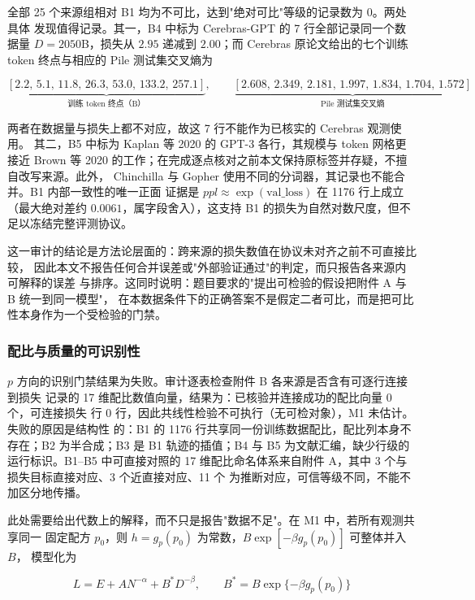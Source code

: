 \documentclass[bwprint]{gmcmthesis}
\numberwithin{equation}{section}
\numberwithin{figure}{section}
\numberwithin{table}{section}
\begin{document}
全部 25 个来源组相对 B1 均为不可比，达到"绝对可比"等级的记录数为 0。两处具体
发现值得记录。其一，B4 中标为 Cerebras-GPT 的 7 行全部记录同一个数据量
$D=2050$B，损失从 $2.95$ 递减到 $2.00$；而 Cerebras 原论文给出的七个训练 token
终点与相应的 Pile 测试集交叉熵为

\begin{equation}
\underbrace{[2.2,\,5.1,\,11.8,\,26.3,\,53.0,\,133.2,\,257.1]}_{\text{训练 token 终点（B）}},
\qquad
\underbrace{[2.608,\,2.349,\,2.181,\,1.997,\,1.834,\,1.704,\,1.572]}_{\text{Pile 测试集交叉熵}}
\end{equation}

两者在数据量与损失上都不对应，故这 7 行不能作为已核实的 Cerebras 观测使用。
其二，B5 中标为 Kaplan 等 2020 的 GPT-3 各行，其规模与 token 网格更接近 Brown 等
2020 的工作；在完成逐点核对之前本文保持原标签并存疑，不擅自改写来源。此外，
Chinchilla 与 Gopher 使用不同的分词器，其记录也不能合并。B1 内部一致性的唯一正面
证据是 $ppl\approx\exp(\mathrm{val\_loss})$ 在 1176 行上成立（最大绝对差约
$0.0061$，属字段舍入），这支持 B1 的损失为自然对数尺度，但不足以冻结完整评测协议。

这一审计的结论是方法论层面的：跨来源的损失数值在协议未对齐之前不可直接比较，
因此本文不报告任何合并误差或"外部验证通过"的判定，而只报告各来源内可解释的误差
与排序。这同时说明：题目要求的"提出可检验的假设把附件 A 与 B 统一到同一模型"，
在本数据条件下的正确答案不是假定二者可比，而是把可比性本身作为一个受检验的门禁。

\subsubsection{配比与质量的可识别性}

$p$ 方向的识别门禁结果为失败。审计逐表检查附件 B 各来源是否含有可逐行连接到损失
记录的 17 维配比数值向量，结果为：已核验并连接成功的配比向量 0 个，可连接损失
行 0 行，因此共线性检验不可执行（无可检对象），M1 未估计。失败的原因是结构性
的：B1 的 1176 行共享同一份训练数据配比，配比列本身不存在；B2 为半合成；B3 是
B1 轨迹的插值；B4 与 B5 为文献汇编，缺少行级的运行标识。B1--B5 中可直接对照的
17 维配比命名体系来自附件 A，其中 3 个与损失目标直接对应、3 个近直接对应、11 个
为推断对应，可信等级不同，不能不加区分地传播。

此处需要给出代数上的解释，而不只是报告"数据不足"。在 M1 中，若所有观测共享同一
固定配方 $p_0$，则 $h=g_p(p_0)$ 为常数，$B\exp[-\beta g_p(p_0)]$ 可整体并入 $B$，
模型化为

\begin{equation}
L=E+AN^{-\alpha}+B^{*}D^{-\beta},\qquad B^{*}=B\exp\{-\beta g_p(p_0)\}
\end{equation}
\end{document}
